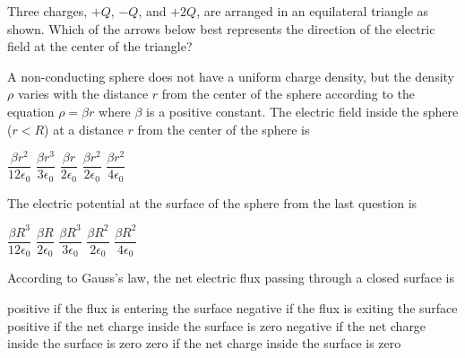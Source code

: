 \documentclass{../../../oss-apphys-exam}
\begin{document}
\begin{multicols*}{2}
\begin{questions}
   \question Three charges, $+Q$, $-Q$, and $+2Q$, are arranged in an
   equilateral triangle as shown. Which of the arrows below best represents the
   direction of the electric field at the center of the triangle?
   \begin{center}
     \vspace{-.1in}
   \end{center}
   \begin{choices}
     \choice {\Huge$\downarrow$}
     \choice {\Huge$\uparrow$}
     \choice {\Huge$\searrow$}
     \choice {\Huge$\swarrow$}
     \choice {\Huge$\nearrow$}
   \end{choices}
 
   \question A non-conducting sphere does not have a uniform charge density,
   but the density $\rho$ varies with the distance $r$ from the center of the
   sphere according to the equation $\rho=\beta r$ where $\beta$ is a positive
   constant. The electric field inside the sphere ($r<R$) at a distance $r$
   from the center of the sphere is
   \begin{choices}
     \choice $\dfrac{\beta r^2}{12\epsilon_0}$
     \choice $\dfrac{\beta r^3}{3\epsilon_0}$
     \choice $\dfrac{\beta r}{2\epsilon_0}$
     \choice $\dfrac{\beta r^2}{2\epsilon_0}$
     \choice $\dfrac{\beta r^2}{4\epsilon_0}$
   \end{choices}
 
   \question The electric potential at the surface of the sphere from the last
   question is
   \begin{choices}
     \choice $\dfrac{\beta R^3}{12\epsilon_0}$
     \choice $\dfrac{\beta R}{2\epsilon_0}$
     \choice $\dfrac{\beta R^3}{3\epsilon_0}$
     \choice $\dfrac{\beta R^2}{2\epsilon_0}$
     \choice $\dfrac{\beta R^2}{4\epsilon_0}$
   \end{choices}
   \columnbreak
   
   \question According to Gauss's law, the net electric flux passing through a
   closed surface is
   \begin{choices}
     \choice positive if the flux is entering the surface
     \choice negative if the flux is exiting the surface
     \choice positive if the net charge inside the surface is zero
     \choice negative if the net charge inside the surface is zero
     \choice zero if the net charge inside the surface is zero
   \end{choices}
   

\end{questions}
\end{multicols*}
\end{document}

